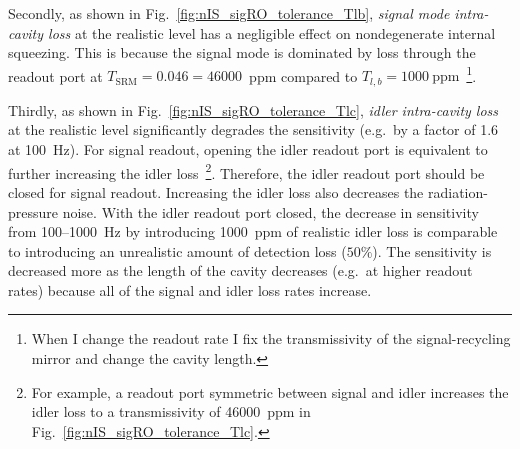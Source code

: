Secondly, as shown in Fig.~\ref{fig:nIS_sigRO_tolerance_Tlb}, \emph{signal mode intra-cavity loss} at the realistic level has a negligible effect on nondegenerate internal squeezing. This is because the signal mode is dominated by loss through the readout port at $T_\text{SRM}=0.046=46000$~ppm compared to $T_{l,b}=1000~\text{ppm}$~\footnote{When I change the readout rate I fix the transmissivity of the signal-recycling mirror and change the cavity length.}. %

Thirdly, as shown in Fig.~\ref{fig:nIS_sigRO_tolerance_Tlc}, \emph{idler intra-cavity loss} at the realistic level significantly degrades the sensitivity (e.g.\ by a factor of 1.6 at 100~Hz). For signal readout, opening the idler readout port is equivalent to further increasing the idler loss~\footnote{For example, a readout port symmetric between signal and idler increases the idler loss to a transmissivity of 46000~ppm in Fig.~\ref{fig:nIS_sigRO_tolerance_Tlc}.}. Therefore, the idler readout port should be closed for signal readout. Increasing the idler loss also decreases the radiation-pressure noise. With the idler readout port closed, the decrease in sensitivity from 100--1000~Hz by introducing 1000~ppm of realistic idler loss is comparable to introducing an unrealistic amount of detection loss ($50\%$). The sensitivity is decreased more as the length of the cavity decreases (e.g.\ at higher readout rates) because all of the signal and idler loss rates increase. 


